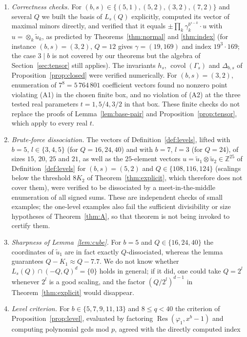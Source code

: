 \documentclass[12pt]{article}
\newcommand{\Z}{\mathbb{Z}}
\newcommand{\covol}{\operatorname{covol}}
\newcommand{\Res}{\operatorname{Res}}
\newcommand{\dcube}[1]{(-#1,#1)}
\begin{document}
\begin{enumerate}[leftmargin=*]
\item \emph{Correctness checks.} For $(b,s)\in\{(5,1),(5,2),(3,2),(7,2)\}$ and several $Q$ we built the basis of $L_s(Q)$
explicitly, computed its vector of maximal minors directly, and verified that it equals
$\pm\prod_k\gamma_k^{b^{s-k}}\cdot u$ with $u=\otimes_k\tilde u_k$, as predicted by Theorems~\ref{thm:normal} and
\ref{thm:index} (for instance $(b,s)=(3,2)$, $Q=12$ gives $\gamma=(19,169)$ and index $19^3\cdot169$; the case $3\mid b$
is not covered by our theorems but the algebra of Section~\ref{sec:tensor} still applies). The invariants $h_s$,
$\covol(\Gamma_s)$ and $\Delta_{b,s}$ of Proposition~\ref{prop:closed} were verified numerically. For $(b,s)=(3,2)$,
enumeration of $7^8=5\,764\,801$ coefficient vectors found no nonzero point violating (A1) in the chosen finite box,
and no violation of (A2) at the three tested real parameters $t=1,5/4,3/2$ in that box. These finite checks do not
replace the proofs of Lemma~\ref{lem:base-pair} and Proposition~\ref{prop:tensor}, which apply to every real $t$.
\item \emph{Brute-force dissociation.} The vectors of Definition~\ref{def:levels}, lifted with $b=5$, $l\in\{3,4,5\}$ (for
$Q=16,24,40$) and with $b=7$, $l=3$ (for $Q=24$), of sizes $15$, $20$, $25$ and $21$, as well as the $25$-element vectors
$u=\tilde u_1\otimes\tilde u_2\in\Z^{25}$ of Definition~\ref{def:levels} for $(b,s)=(5,2)$ and $Q\in\{108,116,124\}$
(scalings below the threshold $8K_2$ of Theorem~\ref{thm:explicit}, which therefore does not cover them), were verified to be dissociated by a
meet-in-the-middle enumeration of all signed sums. These are independent checks of small examples; the one-level
examples also fail the sufficient divisibility or size hypotheses of Theorem~\ref{thm:A}, so that theorem is not
being invoked to certify them.
\item \emph{Sharpness of Lemma~\ref{lem:cube}.} For $b=5$ and $Q\in\{16,24,40\}$ the coordinates of $\tilde u_1$ are in fact
exactly $Q$-dissociated, whereas the lemma guarantees $Q-K_1\approx Q-7.7$. We do not know whether
$L_s(Q)\cap\dcube Q^d=\{0\}$ holds in general; if it did, one could take $Q=2^l$ whenever $2^l$ is a good scaling, and the
factor $(Q/2^l)^{d-1}$ in Theorem~\ref{thm:explicit} would disappear.
\item \emph{Level criterion.} For $b\in\{5,7,9,11,13\}$ and $8\le q<40$ the criterion of Proposition~\ref{prop:level},
evaluated by factoring $\Res(\varphi_1,x^b-1)$ and computing polynomial gcds mod $p$, agreed with the directly computed index

\end{enumerate}
\end{document}
